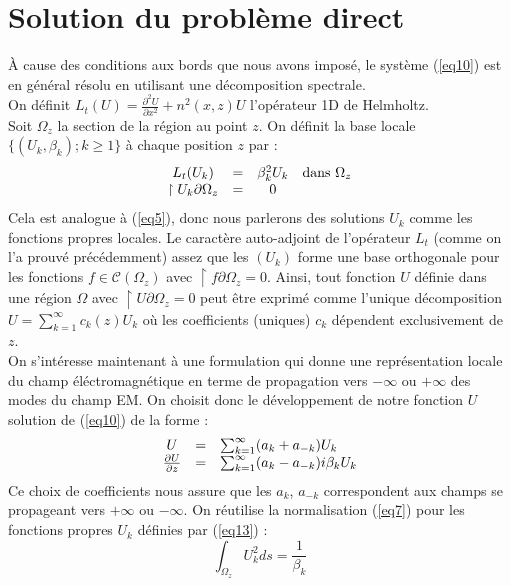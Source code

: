 \documentclass{article}
\begin{document}
\section{Solution du problème direct}
À cause des conditions aux bords que nous avons imposé, le système (\ref{eq10}) est en général résolu en utilisant une décomposition spectrale.\\
On définit $L_t(U)=\frac{\partial^2U}{\partial x^2}+n^2(x,z)U$ l'opérateur 1D de Helmholtz.\\
Soit $\Omega_z$ la section de la région au point $z$. On définit la base locale $\{(U_k,\beta_k);k\geq 1\}$ à chaque position $z$ par : 
\begin{equation} \label{eq13}
	\begin{array}{c c c c}
		L_t(U_k)&=&\beta_k^2U_k &\text{dans } \Omega_z\\
		\restriction{U_k}{\partial\Omega_z}&=&0
	\end{array}
\end{equation}
Cela est analogue à (\ref{eq5}), donc nous parlerons des solutions $U_k$ comme les fonctions propres locales. Le caractère auto-adjoint de l'opérateur $L_t$ (comme on l'a prouvé précédemment) assez que les $(U_k)$ forme une base orthogonale pour les fonctions $f\in\mathscr{C}(\Omega_z)$ avec $\restriction{f}{\partial\Omega_z}=0$. Ainsi, tout fonction $U$ définie dans une région $\Omega$ avec $\restriction{U}{\partial\Omega_z}=0$ peut être exprimé comme l'unique décomposition $U=\sum_{k=1}^\infty c_k(z)U_k$ où les coefficients (uniques) $c_k$ dépendent exclusivement de $z$.\\
On s'intéresse maintenant à une formulation qui donne une représentation locale du champ éléctromagnétique en terme de propagation vers $-\infty$ ou $+\infty$ des modes du champ EM.
On choisit donc le développement de notre fonction $U$ solution de (\ref{eq10}) de la forme :
\begin{equation}\label{eq14}
\begin{array}{c c l}
U&=&\sum_{k=1}^\infty (a_k+a_{-k})U_k\\
\frac{\partial U}{\partial z}&=&\sum_{k=1}^\infty (a_k-a_{-k})i\beta_kU_k
\end{array}
\end{equation}
Ce choix de coefficients nous assure que les $a_k$, $a_{-k}$ correspondent aux champs se propageant vers $+\infty$ ou $-\infty$. On réutilise la normalisation (\ref{eq7}) pour les fonctions propres $U_k$ définies par (\ref{eq13}) :
\begin{equation}\label{eq15}
	\int_{\Omega_z} U_k^2ds=\frac{1}{\beta_k}
\end{equation}
\end{document}
